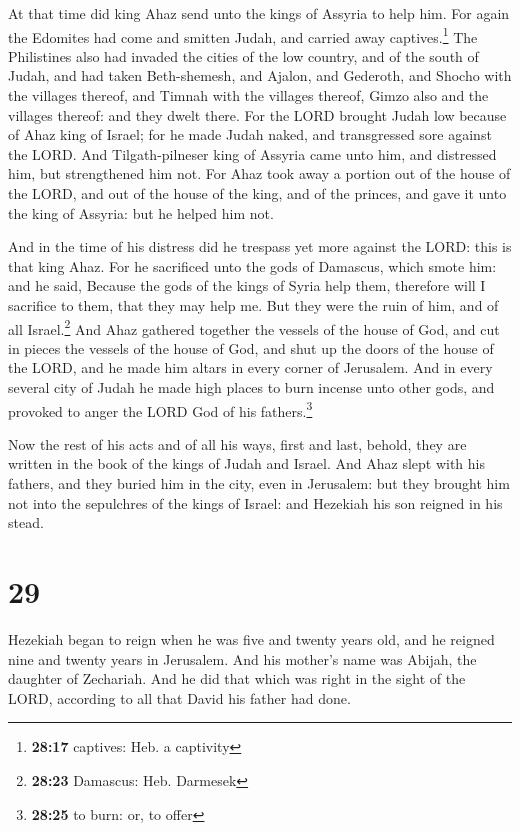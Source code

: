  At that time did king Ahaz send unto the kings of
Assyria to help him.  For again the Edomites had come and
smitten Judah, and carried away captives.\footnote{\textbf{28:17}
  captives: Heb. a captivity}  The Philistines also had
invaded the cities of the low country, and of the south of Judah, and
had taken Beth-shemesh, and Ajalon, and Gederoth, and Shocho with the
villages thereof, and Timnah with the villages thereof, Gimzo also and
the villages thereof: and they dwelt there.  For the LORD
brought Judah low because of Ahaz king of Israel; for he made Judah
naked, and transgressed sore against the LORD.  And
Tilgath-pilneser king of Assyria came unto him, and distressed him, but
strengthened him not.  For Ahaz took away a portion out
of the house of the LORD, and out of the house of the king, and of the
princes, and gave it unto the king of Assyria: but he helped him not.

 And in the time of his distress did he trespass yet more
against the LORD: this is that king Ahaz.  For he
sacrificed unto the gods of Damascus, which smote him: and he said,
Because the gods of the kings of Syria help them, therefore will I
sacrifice to them, that they may help me. But they were the ruin of him,
and of all Israel.\footnote{\textbf{28:23} Damascus: Heb. Darmesek}
 And Ahaz gathered together the vessels of the house of
God, and cut in pieces the vessels of the house of God, and shut up the
doors of the house of the LORD, and he made him altars in every corner
of Jerusalem.  And in every several city of Judah he made
high places to burn incense unto other gods, and provoked to anger the
LORD God of his fathers.\footnote{\textbf{28:25} to burn: or, to offer}

 Now the rest of his acts and of all his ways, first and
last, behold, they are written in the book of the kings of Judah and
Israel.  And Ahaz slept with his fathers, and they buried
him in the city, even in Jerusalem: but they brought him not into the
sepulchres of the kings of Israel: and Hezekiah his son reigned in his
stead.

\hypertarget{section-28}{%
\section{29}\label{section-28}}

 Hezekiah began to reign when he was five and twenty years
old, and he reigned nine and twenty years in Jerusalem. And his mother's
name was Abijah, the daughter of Zechariah.  And he did
that which was right in the sight of the LORD, according to all that
David his father had done.

